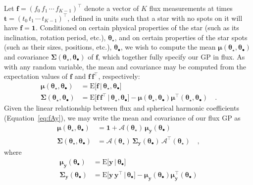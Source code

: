 \documentclass[modern]{aastex62}
\begin{document}
Let
$\mathbf{f} = \left( f_0 \, f_1 \, \cdots \,  f_{K-1} \right)^\top$
denote a vector of $K$ flux measurements at times
$\mathbf{t} = \left( t_0 \,  t_1 \,  \cdots \, t_{K-1} \right)^\top$,
defined in units such that a star with no spots on it will have
$\mathbf{f} = \mathbf{1}$.
Conditioned on certain physical properties of the
star
(such as its inclination, rotation period, etc.), $\pmb{\theta}_\star$,
and on certain properties of the  star spots
(such as their sizes, positions, etc.), $\pmb{\theta}_\bullet$,
we wish to compute the mean $\pmb{\mu}(\pmb{\theta}_\star, \pmb{\theta}_\bullet)$ and
covariance $\pmb{\Sigma}(\pmb{\theta}_\star, \pmb{\theta}_\bullet)$
of $\mathbf{f}$, which together fully specify our GP in flux.
%
As with any random variable, the mean and covariance may be computed from
the expectation values of $\mathbf{f}$ and
$\mathbf{f}\,\mathbf{f}^\top$, respectively:
%
\begin{align}
    \label{eq:mean}
    \pmb{\mu}(\pmb{\theta}_\star, \pmb{\theta}_\bullet)
     & = \mathrm{E} \Big[ \mathbf{f} \, \Big| \, \pmb{\theta}_\star, \pmb{\theta}_\bullet \Big]
    \\
    \label{eq:cov}
    \pmb{\Sigma}(\pmb{\theta}_\star, \pmb{\theta}_\bullet)
     & = \mathrm{E} \Big[ \mathbf{f} \, \mathbf{f}^\top \, \Big| \, \pmb{\theta}_\star, \pmb{\theta}_\bullet \Big] - \pmb{\mu}(\pmb{\theta}_\star, \pmb{\theta}_\bullet) \pmb{\mu}^\top(\pmb{\theta}_\star, \pmb{\theta}_\bullet)
    \quad.
\end{align}
%
Given the linear relationship between flux and spherical harmonic
coefficients (Equation~\ref{eq:fAy}),
we may write the mean and covariance of our flux GP as
%
\begin{align}
    \label{eq:mean_f}
    \pmb{\mu}(\pmb{\theta}_\star, \pmb{\theta}_\bullet)
     & = \mathbf{1} + \pmb{\mathcal{A}}(\pmb{\theta}_\star) \, \pmb{\mu}_{\mathbf{y}}(\pmb{\theta}_\bullet)
    \\
    \label{eq:cov_f}
    \pmb{\Sigma}(\pmb{\theta}_\star, \pmb{\theta}_\bullet)
     & = \pmb{\mathcal{A}}(\pmb{\theta}_\star) \, \pmb{\Sigma}_{\mathbf{y}}(\pmb{\theta}_\bullet) \, \pmb{\mathcal{A}}^\top(\pmb{\theta}_\star)
    \quad,
\end{align}
%
where
%
\begin{align}
    \label{eq:mean_y}
    \pmb{\mu}_{\mathbf{y}}(\pmb{\theta}_\bullet)
     & = \mathrm{E} \Big[ \mathbf{y} \, \Big| \, \pmb{\theta}_\bullet \Big]
    \\
    \label{eq:cov_y}
    \pmb{\Sigma}_{\mathbf{y}}(\pmb{\theta}_\bullet)
     & = \mathrm{E} \Big[ \mathbf{y} \, \mathbf{y}^\top \, \Big| \, \pmb{\theta}_\bullet \Big] - \pmb{\mu}_{\mathbf{y}}(\pmb{\theta}_\bullet) \pmb{\mu}_{\mathbf{y}}^\top(\pmb{\theta}_\bullet)
\end{align}
\end{document}
